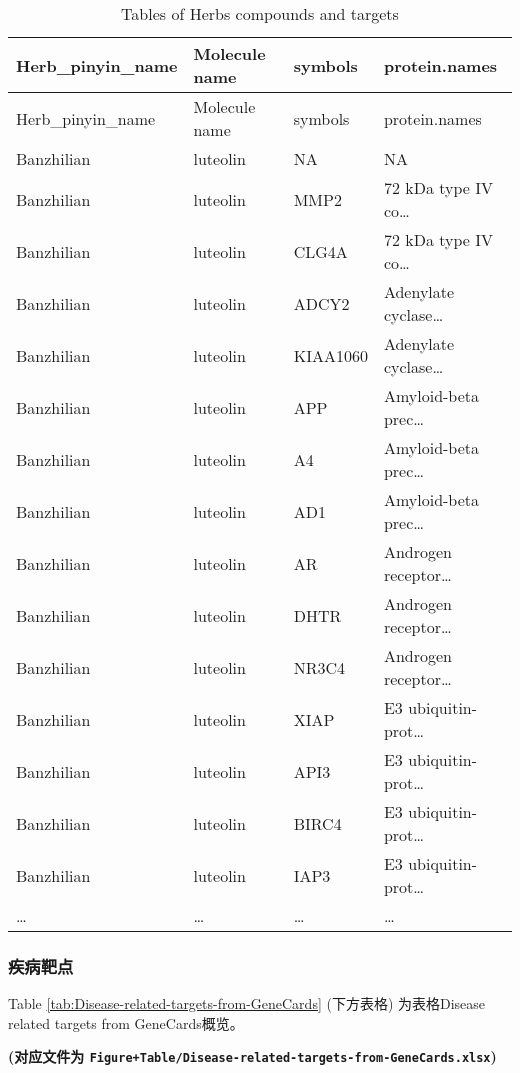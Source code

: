 \documentclass[
]{article}
\begin{document}
\begin{longtable}[]{@{}llll@{}}
\caption{\label{tab:tables-of-Herbs-compounds-and-targets}Tables of Herbs compounds and targets}\tabularnewline
\toprule
Herb\_pinyin\_name & Molecule name & symbols & protein.names\tabularnewline
\midrule
\endfirsthead
\toprule
Herb\_pinyin\_name & Molecule name & symbols & protein.names\tabularnewline
\midrule
\endhead
Banzhilian & luteolin & NA & NA\tabularnewline
Banzhilian & luteolin & MMP2 & 72 kDa type IV co\ldots{}\tabularnewline
Banzhilian & luteolin & CLG4A & 72 kDa type IV co\ldots{}\tabularnewline
Banzhilian & luteolin & ADCY2 & Adenylate cyclase\ldots{}\tabularnewline
Banzhilian & luteolin & KIAA1060 & Adenylate cyclase\ldots{}\tabularnewline
Banzhilian & luteolin & APP & Amyloid-beta prec\ldots{}\tabularnewline
Banzhilian & luteolin & A4 & Amyloid-beta prec\ldots{}\tabularnewline
Banzhilian & luteolin & AD1 & Amyloid-beta prec\ldots{}\tabularnewline
Banzhilian & luteolin & AR & Androgen receptor\ldots{}\tabularnewline
Banzhilian & luteolin & DHTR & Androgen receptor\ldots{}\tabularnewline
Banzhilian & luteolin & NR3C4 & Androgen receptor\ldots{}\tabularnewline
Banzhilian & luteolin & XIAP & E3 ubiquitin-prot\ldots{}\tabularnewline
Banzhilian & luteolin & API3 & E3 ubiquitin-prot\ldots{}\tabularnewline
Banzhilian & luteolin & BIRC4 & E3 ubiquitin-prot\ldots{}\tabularnewline
Banzhilian & luteolin & IAP3 & E3 ubiquitin-prot\ldots{}\tabularnewline
\ldots{} & \ldots{} & \ldots{} & \ldots{}\tabularnewline
\bottomrule
\end{longtable}

\hypertarget{ux75beux75c5ux9776ux70b9}{%
\subsubsection{疾病靶点}\label{ux75beux75c5ux9776ux70b9}}

Table \ref{tab:Disease-related-targets-from-GeneCards} (下方表格) 为表格Disease related targets from GeneCards概览。

\textbf{(对应文件为 \texttt{Figure+Table/Disease-related-targets-from-GeneCards.xlsx})}
\end{document}
